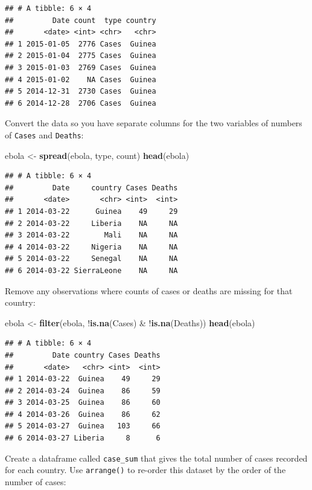\documentclass[]{book}
\makeatletter
\newenvironment{Shaded}{\begin{snugshade}}{\end{snugshade}}
\newcommand{\KeywordTok}[1]{\textcolor[rgb]{0.13,0.29,0.53}{\textbf{{#1}}}}
\newcommand{\StringTok}[1]{\textcolor[rgb]{0.31,0.60,0.02}{{#1}}}
\newcommand{\NormalTok}[1]{{#1}}
\newenvironment{kframe}{%
\medskip{}
\setlength{\fboxsep}{.8em}
 \def\at@end@of@kframe{}%
 \ifinner\ifhmode%
  \def\at@end@of@kframe{\end{minipage}}%
  \begin{minipage}{\columnwidth}%
 \fi\fi%
 \def\FrameCommand##1{\hskip\@totalleftmargin \hskip-\fboxsep
 \colorbox{shadecolor}{##1}\hskip-\fboxsep
     \hskip-\linewidth \hskip-\@totalleftmargin \hskip\columnwidth}%
 \MakeFramed {\advance\hsize-\width
   \@totalleftmargin\z@ \linewidth\hsize
   \@setminipage}}%
 {\par\unskip\endMakeFramed%
 \at@end@of@kframe}
\renewenvironment{Shaded}{\begin{kframe}}{\end{kframe}}
\makeatother
\begin{document}
\begin{verbatim}
## # A tibble: 6 × 4
##         Date count  type country
##       <date> <int> <chr>   <chr>
## 1 2015-01-05  2776 Cases  Guinea
## 2 2015-01-04  2775 Cases  Guinea
## 3 2015-01-03  2769 Cases  Guinea
## 4 2015-01-02    NA Cases  Guinea
## 5 2014-12-31  2730 Cases  Guinea
## 6 2014-12-28  2706 Cases  Guinea
\end{verbatim}

Convert the data so you have separate columns for the two variables of
numbers of \texttt{Cases} and \texttt{Deaths}:

\begin{Shaded}
\begin{Highlighting}[]
\NormalTok{ebola <-}\StringTok{ }\KeywordTok{spread}\NormalTok{(ebola, type, count)}
\KeywordTok{head}\NormalTok{(ebola)}
\end{Highlighting}
\end{Shaded}

\begin{verbatim}
## # A tibble: 6 × 4
##         Date     country Cases Deaths
##       <date>       <chr> <int>  <int>
## 1 2014-03-22      Guinea    49     29
## 2 2014-03-22     Liberia    NA     NA
## 3 2014-03-22        Mali    NA     NA
## 4 2014-03-22     Nigeria    NA     NA
## 5 2014-03-22     Senegal    NA     NA
## 6 2014-03-22 SierraLeone    NA     NA
\end{verbatim}

Remove any observations where counts of cases or deaths are missing for
that country:

\begin{Shaded}
\begin{Highlighting}[]
\NormalTok{ebola <-}\StringTok{ }\KeywordTok{filter}\NormalTok{(ebola, !}\KeywordTok{is.na}\NormalTok{(Cases) &}\StringTok{ }\NormalTok{!}\KeywordTok{is.na}\NormalTok{(Deaths))}
\KeywordTok{head}\NormalTok{(ebola)}
\end{Highlighting}
\end{Shaded}

\begin{verbatim}
## # A tibble: 6 × 4
##         Date country Cases Deaths
##       <date>   <chr> <int>  <int>
## 1 2014-03-22  Guinea    49     29
## 2 2014-03-24  Guinea    86     59
## 3 2014-03-25  Guinea    86     60
## 4 2014-03-26  Guinea    86     62
## 5 2014-03-27  Guinea   103     66
## 6 2014-03-27 Liberia     8      6
\end{verbatim}

Create a dataframe called \texttt{case\_sum} that gives the total number
of cases recorded for each country. Use \texttt{arrange()} to re-order
this dataset by the order of the number of cases:
\end{document}
